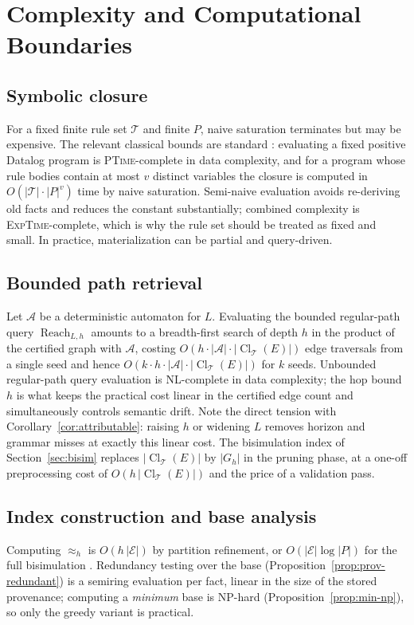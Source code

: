 \documentclass[11pt]{article}
\newcommand{\Cl}{\operatorname{Cl}}
\newcommand{\Reach}{\operatorname{Reach}}
\newcommand{\T}{\mathcal{T}}
\begin{document}
\section{Complexity and Computational Boundaries}

\subsection{Symbolic closure}
For a fixed finite rule set $\T$ and finite $P$, naive saturation terminates but may be expensive. The relevant classical bounds are standard \citep{abiteboul1995}: evaluating a fixed positive Datalog program is \textsc{PTime}-complete in data complexity, and for a program whose rule bodies contain at most $v$ distinct variables the closure is computed in $O(|\T|\cdot|P|^{v})$ time by naive saturation. Semi-naive evaluation avoids re-deriving old facts and reduces the constant substantially; combined complexity is \textsc{ExpTime}-complete, which is why the rule set should be treated as fixed and small. In practice, materialization can be partial and query-driven.

\subsection{Bounded path retrieval}
Let $\mathcal{A}$ be a deterministic automaton for $L$. Evaluating the bounded regular-path query $\Reach_{L,h}$ amounts to a breadth-first search of depth $h$ in the product of the certified graph with $\mathcal{A}$, costing $O(h\cdot|\mathcal{A}|\cdot|\Cl_{\T}(E)|)$ edge traversals from a single seed and hence $O(k\cdot h\cdot|\mathcal{A}|\cdot|\Cl_{\T}(E)|)$ for $k$ seeds. Unbounded regular-path query evaluation is \textsc{NL}-complete in data complexity; the hop bound $h$ is what keeps the practical cost linear in the certified edge count and simultaneously controls semantic drift. Note the direct tension with Corollary~\ref{cor:attributable}: raising $h$ or widening $L$ removes horizon and grammar misses at exactly this linear cost. The bisimulation index of Section~\ref{sec:bisim} replaces $|\Cl_{\T}(E)|$ by $|G_h|$ in the pruning phase, at a one-off preprocessing cost of $O(h\,|\Cl_{\T}(E)|)$ and the price of a validation pass.

\subsection{Index construction and base analysis}
Computing $\approx_h$ is $O(h\,|\mathcal{E}|)$ by partition refinement, or $O(|\mathcal{E}|\log|P|)$ for the full bisimulation \citep{paige1987}. Redundancy testing over the base (Proposition~\ref{prop:prov-redundant}) is a semiring evaluation per fact, linear in the size of the stored provenance; computing a \emph{minimum} base is NP-hard (Proposition~\ref{prop:min-np}), so only the greedy variant is practical.
\end{document}
